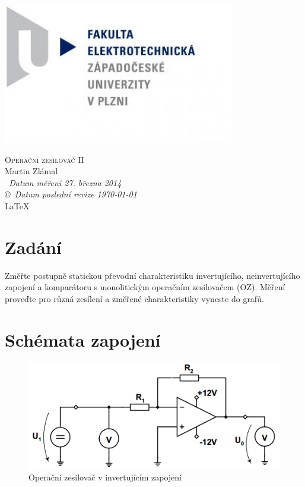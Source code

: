 \documentclass[12pt]{article} %
\begin{document}
\begin{titlepage}
	\includegraphics[scale=0.7]{logo.jpg}
	\vspace*{\fill}
	\begin{center}
		\textsc{\LARGE Operační zesilovač II}\\[1cm]
		Martin Zlámal \\[1cm]
		{\small\em \ Datum měření 27. března 2014 } \\
		{\small\em \copyright \ Datum poslední revize \today } \\
		\LaTeX
	\end{center}
	\vspace*{\fill}
\end{titlepage}
\newpage

\section{Zadání}
Změřte postupně statickou převodní charakteristiku invertujícího, neinvertujícího 
zapojení a komparátoru s monolitickým operačním zesilovačem (OZ). Měření proveďte pro 
různá zesílení a změřené charakteristiky vyneste do grafů.

\section{Schémata zapojení}
\begin{figure}[H]
\center
\includegraphics[scale=0.7]{schema1.png}
\caption{Operační zesilovač v invertujícím zapojení}
\end{figure}
\end{document}
